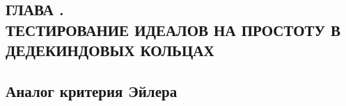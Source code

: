 \documentclass[_00_dissertation.tex]{subfiles}
\begin{document}
\onlyinsubfile{
    \renewcommand{\contentsname}{ОГЛАВЛЕНИЕ}
    \setcounter{tocdepth}{3}
    \tableofcontents
}

\newpage
\begin{center}
    \section*{ГЛАВА .\\ ТЕСТИРОВАНИЕ ИДЕАЛОВ НА ПРОСТОТУ В ДЕДЕКИНДОВЫХ КОЛЬЦАХ}\label{ch:Primality}
\end{center}

\subsection{Аналог критерия Эйлера}
\end{document}
